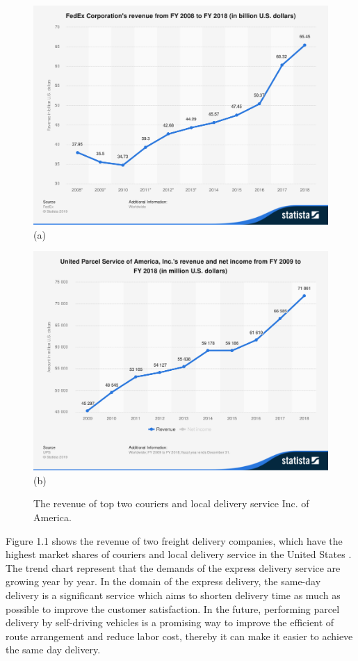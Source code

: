 \documentclass[12pt]{ksthesis}
\begin{document}
\begin{thesis}
{\begin{figure}
\footnotesize
\begin{minipage}[t]{0.48\linewidth}
    \centering
    \includegraphics*[width=\linewidth]{./figures/F1-a.PNG}
    (a)
\end{minipage}
\begin{minipage}[t]{0.48\linewidth}
    \centering
    \includegraphics*[width=\linewidth]{./figures/F1-b.PNG}
    (b)
\end{minipage}
\normalsize
\caption{\large The revenue of top two couriers and local delivery service Inc. of America.}
\label{fig:UnitedParcelService}
\end{figure} 

Figure 1.1 shows the revenue of two freight delivery companies, which have the highest market shares of couriers and local delivery service in the United States \cite{CourierMarket}. The trend chart represent that the demands of the express delivery service are growing year by year. In the domain of the express delivery, the same-day delivery is a significant service which aims to shorten delivery time as much as possible to improve the customer satisfaction. In the future, performing parcel delivery by self-driving vehicles is a promising way to improve the efficient of route arrangement and reduce labor cost, thereby it can make it easier to achieve the same day delivery.

}
\end{thesis}
\end{document}
